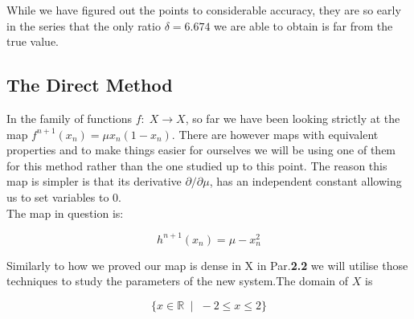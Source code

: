 \begin{table}[h]
\centering
{}
\caption{The ratio $\delta_k$ as estimated from data gathered by computing fixed points}
\label{tab:feigentable2}
\end{table}

While we have figured out the points to considerable accuracy, they are so early in the series that the only
ratio $\delta = 6.674$ we are able to obtain is far from the true value.

\subsection{The Direct Method}

In the family of functions $f:\; X\to X$, so far we have been looking strictly at the map
$f^{n+1}(x_n) = \mu x_n (1 - x_n)$. There are however maps with equivalent properties and to make things
easier for ourselves we will be using one of them for this method rather than the one studied up to this point.
The reason this map is simpler is that its derivative $\partial / \partial \mu$, has an independent constant allowing
us to set variables to 0.\\
The map in question is:

\begin{equation}
    h^{n+1}(x_n) = \mu - x_n^2
\end{equation}

Similarly to how we proved our map is dense in X in Par.\textbf{2.2} we will utilise those techniques
to study the parameters of the new system.The domain of $X$ is

\begin{equation}
\{x \in \mathbb{R} \; \mid \;  -2 \leq x \leq 2 \}
\end{equation}

